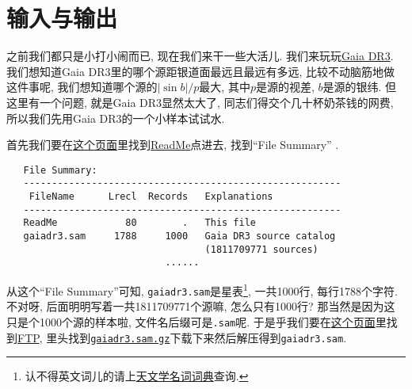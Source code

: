 \chapter{输入与输出}\label{io}

之前我们都只是小打小闹而已, 现在我们来干一些大活儿. 我们来玩玩\href{https://cdsarc.cds.unistra.fr/viz-bin/cat/I/355}{Gaia DR3}. 我们想知道Gaia DR3里的哪个源距银道面最远且最远有多远, 比较不动脑筋地做这件事呢, 我们想知道哪个源的$\left\lvert \sin b\right\rvert/p$最大, 其中$p$是源的视差, $b$是源的银纬. 但这里有一个问题, 就是Gaia DR3显然太大了, 同志们得交个几十杯奶茶钱的网费, 所以我们先用Gaia DR3的一个小样本试试水.

首先我们要在\href{https://cdsarc.cds.unistra.fr/viz-bin/cat/I/355}{这个页面}里找到\href{https://cdsarc.cds.unistra.fr/viz-bin/ReadMe/I/355?format=html&tex=true}{ReadMe}点进去, 找到``File Summary'' .
\begin{lstlisting}
   File Summary:
   --------------------------------------------------------
    FileName      Lrecl  Records   Explanations
   --------------------------------------------------------
   ReadMe            80        .   This file
   gaiadr3.sam     1788     1000   Gaia DR3 source catalog
                                   (1811709771 sources)
                            ......
\end{lstlisting}
从这个``File Summary''可知, \texttt{gaiadr3.sam}是星表\footnote{认不得英文词儿的请上\href{https://nadc.china-vo.org/astrodict/}{天文学名词词典}查询.}, 一共1000行, 每行1788个字符. 不对呀, 后面明明写着一共1811709771个源嘛, 怎么只有1000行? 那当然是因为这只是个1000个源的样本啦, 文件名后缀可是\texttt{.sam}呢. 于是乎我们要在\href{https://cdsarc.cds.unistra.fr/viz-bin/cat/I/355}{这个页面}里找到\href{https://cdsarc.cds.unistra.fr/ftp/I/355}{FTP}, 里头找到\href{https://cdsarc.cds.unistra.fr/ftp/I/355/gaiadr3.sam.gz}{\texttt{gaiadr3.sam.gz}}下载下来然后解压得到\texttt{gaiadr3.sam}.

